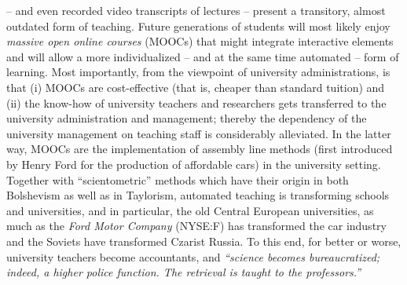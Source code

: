  -- and even recorded video transcripts of lectures -- present a transitory,
almost outdated form of teaching.
Future generations of students will most likely enjoy
{\em massive open online courses} (MOOCs) that might integrate interactive elements
and will allow a more individualized -- and at the same time automated -- form of learning.
Most importantly, from the viewpoint of university administrations,
is that (i) MOOCs are cost-effective (that is, cheaper than standard tuition)
and  (ii) the know-how of university teachers and researchers gets transferred to the
university administration and management; thereby the dependency of the university management
on teaching staff is considerably alleviated.
In the latter way, MOOCs are the implementation of
assembly line methods (first introduced by Henry Ford for the production of affordable cars)
in the university setting.
Together with ``scientometric'' methods which have their origin in both Bolshevism as well as in Taylorism\cite{taylor-1911},
automated teaching
is transforming schools and universities, and in particular, the old Central European universities,
as much as the {\em Ford Motor Company} (NYSE:F)  has transformed
the car industry and the Soviets have transformed Czarist Russia.
To this end, for better or worse, university teachers become accountants\cite{svozil-2011-sklaverei},
and {\it ``science becomes bureaucratized; indeed, a higher police function.
The retrieval is taught to the professors.\cite{juenger-Heliopolis}''}


